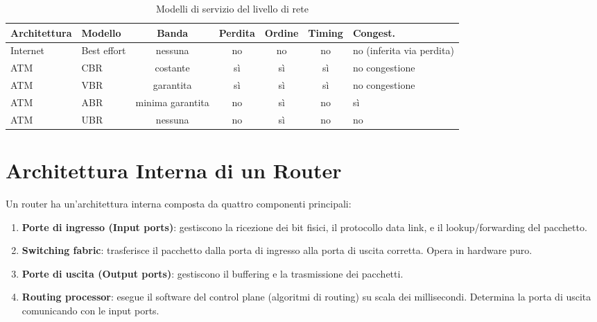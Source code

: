 \begin{table}[h]
\centering
\begin{tabularx}{\textwidth}{|X|X|c|c|c|c|X|}
\hline
\textbf{Architettura} & \textbf{Modello} & \textbf{Banda} & \textbf{Perdita} & \textbf{Ordine} & \textbf{Timing} & \textbf{Congest.} \\
\hline
Internet & Best effort & nessuna & no & no & no & no (inferita via perdita) \\
ATM & CBR & costante & sì & sì & sì & no congestione \\
ATM & VBR & garantita & sì & sì & sì & no congestione \\
ATM & ABR & minima garantita & no & sì & no & sì \\
ATM & UBR & nessuna & no & sì & no & no \\
\hline
\end{tabularx}
\caption{Modelli di servizio del livello di rete}
\end{table}



\section{Architettura Interna di un Router}

Un router ha un'architettura interna composta da quattro componenti principali:

\begin{enumerate}
    \item \textbf{Porte di ingresso (Input ports)}: gestiscono la ricezione dei bit fisici, il protocollo data link, e il lookup/forwarding del pacchetto.
    \item \textbf{Switching fabric}: trasferisce il pacchetto dalla porta di ingresso alla porta di uscita corretta. Opera in hardware puro.
    \item \textbf{Porte di uscita (Output ports)}: gestiscono il buffering e la trasmissione dei pacchetti.
    \item \textbf{Routing processor}: esegue il software del control plane (algoritmi di routing) su scala dei millisecondi. Determina la porta di uscita comunicando con le input ports.
\end{enumerate}

